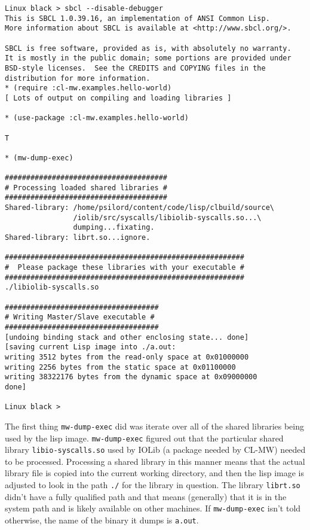 \documentclass[titlepage,12pt]{book}
\newcommand{\xsmall}{\latexhtml{\small}{}}
\newcommand{\xnormalsize}{\latexhtml{\normalsize}{}}
\newcommand{\clmw}{\xsmall\textsc{CL-MW}\xnormalsize\xspace}
\newcommand{\func}[1]{\mbox{\texttt{#1}}\xspace}
\newcommand{\file}[1]{\texttt{#1}\xspace}
\begin{document}
\small
\begin{verbatim}
Linux black > sbcl --disable-debugger
This is SBCL 1.0.39.16, an implementation of ANSI Common Lisp.
More information about SBCL is available at <http://www.sbcl.org/>.

SBCL is free software, provided as is, with absolutely no warranty.
It is mostly in the public domain; some portions are provided under
BSD-style licenses.  See the CREDITS and COPYING files in the
distribution for more information.
* (require :cl-mw.examples.hello-world)
[ Lots of output on compiling and loading libraries ]

* (use-package :cl-mw.examples.hello-world)

T

* (mw-dump-exec)

######################################
# Processing loaded shared libraries #
######################################
Shared-library: /home/psilord/content/code/lisp/clbuild/source\
                /iolib/src/syscalls/libiolib-syscalls.so...\
                dumping...fixating.
Shared-library: librt.so...ignore.

########################################################
#  Please package these libraries with your executable #
########################################################
./libiolib-syscalls.so

####################################
# Writing Master/Slave executable #
####################################
[undoing binding stack and other enclosing state... done]
[saving current Lisp image into ./a.out:
writing 3512 bytes from the read-only space at 0x01000000
writing 2256 bytes from the static space at 0x01100000
writing 38322176 bytes from the dynamic space at 0x09000000
done]

Linux black >
\end{verbatim}
\normalsize

The first thing \func{mw-dump-exec} did was iterate over all of the
shared libraries being used by the lisp image. \func{mw-dump-exec}
figured out that the particular shared library \file{libio-syscalls.so}
used by IOLib (a package needed by \clmw) needed to be processed.
Processing a shared library in this manner means that the actual library
file is copied into the current working directory, and then the lisp image
is adjusted to look in the path \file{./} for the library in question.
The library \file{librt.so} didn't have a fully qualified path and that means
(generally) that it is in the system path and is likely available on other
machines. If \func{mw-dump-exec} isn't told otherwise, the name of the binary
it dumps is \file{a.out}.
\end{document}
